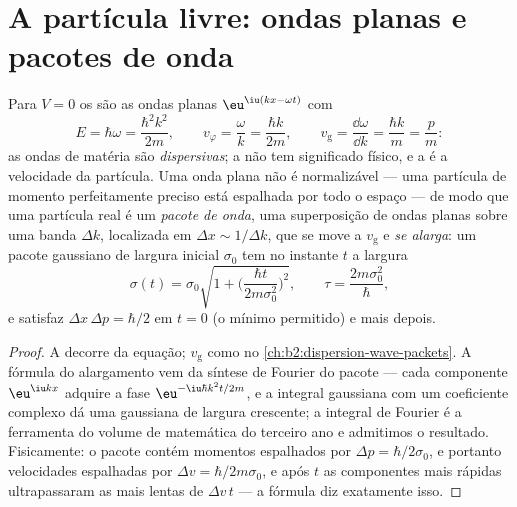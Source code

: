 \section{A partícula livre: ondas planas e pacotes de onda}

\begin{proposition}\label{prop:b2:schrodinger-wave-functions:free}
Para $V = 0$ os  são as ondas planas $\eu^{\iu(kx -
\omega t)}$ com
\[
E = \hbar\omega = \frac{\hbar^2k^2}{2m}, \qquad
v_\varphi = \frac{\omega}{k} = \frac{\hbar k}{2m}, \qquad
v_{\text{g}} = \frac{\dd\omega}{\dd k} = \frac{\hbar k}{m} = \frac{p}{m} :
\]
as ondas de matéria são \emph{dispersivas}; a  não tem
significado físico, e a \emph{} é a velocidade da partícula. Uma onda
plana não é normalizável --- uma partícula de momento perfeitamente preciso está
espalhada por todo o espaço --- de modo que uma partícula real é um \emph{pacote
de onda}, uma superposição de ondas planas sobre uma banda
$\Delta k$, localizada em $\Delta x \sim 1/\Delta k$, que se move a $v_{\text{g}}$ e
\emph{se alarga}: um pacote gaussiano de largura inicial $\sigma_0$ tem no
instante $t$ a largura
\[
\sigma(t) = \sigma_0\sqrt{1 + \Big(\frac{\hbar t}{2m\sigma_0^2}\Big)^2}, \qquad
\tau = \frac{2m\sigma_0^2}{\hbar} ,
\]
e satisfaz $\Delta x\,\Delta p = \hbar/2$ em $t = 0$ (o mínimo permitido)
e mais depois.
\end{proposition}

\begin{proof}
A  decorre da equação; $v_{\text{g}}$ como no
\cref{ch:b2:dispersion-wave-packets}. A fórmula do alargamento vem da
síntese de Fourier do pacote --- cada componente $\eu^{\iu kx}$ adquire
a fase $\eu^{-\iu\hbar k^2t/2m}$, e a integral gaussiana com um
coeficiente complexo dá uma gaussiana de largura crescente; a integral
de Fourier é a ferramenta do volume de matemática do terceiro ano e admitimos o
resultado. Fisicamente: o pacote contém momentos espalhados por $\Delta p
= \hbar/2\sigma_0$, e portanto velocidades espalhadas por $\Delta v = \hbar/2m\sigma_0$,
e após $t$ as componentes mais rápidas ultrapassaram as mais lentas de $\Delta v\,t$
--- a fórmula diz exatamente isso.
\end{proof}

